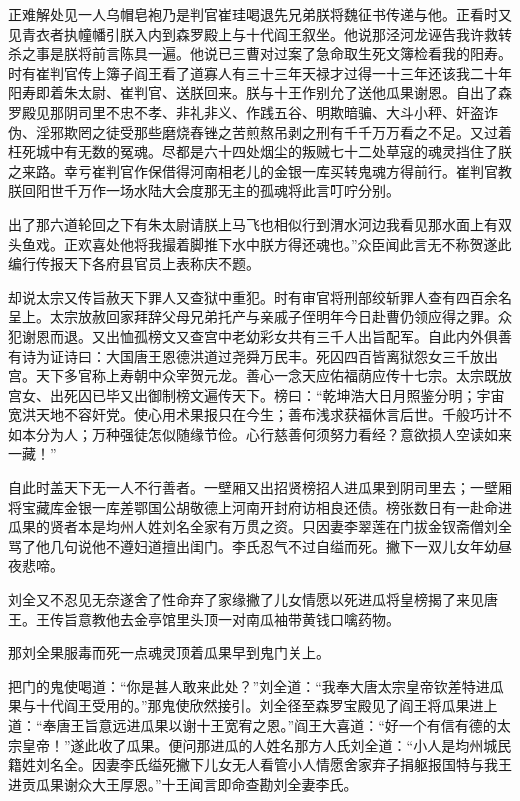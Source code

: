 \documentclass[12pt,UTF8]{ctexbook}
\begin{document}
{正难解处见一人乌帽皂袍乃是判官崔珪喝退先兄弟朕将魏征书传递与他。正看时又见青衣者执幢幡引朕入内到森罗殿上与十代阎王叙坐。他说那泾河龙诬告我许救转杀之事是朕将前言陈具一遍。他说已三曹对过案了急命取生死文簿检看我的阳寿。时有崔判官传上簿子阎王看了道寡人有三十三年天禄才过得一十三年还该我二十年阳寿即着朱太尉、崔判官、送朕回来。朕与十王作别允了送他瓜果谢恩。自出了森罗殿见那阴司里不忠不孝、非礼非义、作践五谷、明欺暗骗、大斗小秤、奸盗诈伪、淫邪欺罔之徒受那些磨烧舂锉之苦煎熬吊剥之刑有千千万万看之不足。又过着枉死城中有无数的冤魂。尽都是六十四处烟尘的叛贼七十二处草寇的魂灵挡住了朕之来路。幸亏崔判官作保借得河南相老儿的金银一库买转鬼魂方得前行。崔判官教朕回阳世千万作一场水陆大会度那无主的孤魂将此言叮咛分别。

出了那六道轮回之下有朱太尉请朕上马飞也相似行到渭水河边我看见那水面上有双头鱼戏。正欢喜处他将我撮着脚推下水中朕方得还魂也。”众臣闻此言无不称贺遂此编行传报天下各府县官员上表称庆不题。

却说太宗又传旨赦天下罪人又查狱中重犯。时有审官将刑部绞斩罪人查有四百余名呈上。太宗放赦回家拜辞父母兄弟托产与亲戚子侄明年今日赴曹仍领应得之罪。众犯谢恩而退。又出恤孤榜文又查宫中老幼彩女共有三千人出旨配军。自此内外俱善有诗为证诗曰：大国唐王恩德洪道过尧舜万民丰。死囚四百皆离狱怨女三千放出宫。天下多官称上寿朝中众宰贺元龙。善心一念天应佑福荫应传十七宗。太宗既放宫女、出死囚已毕又出御制榜文遍传天下。榜曰：“乾坤浩大日月照鉴分明；宇宙宽洪天地不容奸党。使心用术果报只在今生；善布浅求获福休言后世。千般巧计不如本分为人；万种强徒怎似随缘节俭。心行慈善何须努力看经？意欲损人空读如来一藏！”

自此时盖天下无一人不行善者。一壁厢又出招贤榜招人进瓜果到阴司里去；一壁厢将宝藏库金银一库差鄂国公胡敬德上河南开封府访相良还债。榜张数日有一赴命进瓜果的贤者本是均州人姓刘名全家有万贯之资。只因妻李翠莲在门拔金钗斋僧刘全骂了他几句说他不遵妇道擅出闺门。李氏忍气不过自缢而死。撇下一双儿女年幼昼夜悲啼。

刘全又不忍见无奈遂舍了性命弃了家缘撇了儿女情愿以死进瓜将皇榜揭了来见唐王。王传旨意教他去金亭馆里头顶一对南瓜袖带黄钱口噙药物。

那刘全果服毒而死一点魂灵顶着瓜果早到鬼门关上。

把门的鬼使喝道：“你是甚人敢来此处？”刘全道：“我奉大唐太宗皇帝钦差特进瓜果与十代阎王受用的。”那鬼使欣然接引。刘全径至森罗宝殿见了阎王将瓜果进上道：“奉唐王旨意远进瓜果以谢十王宽宥之恩。”阎王大喜道：“好一个有信有德的太宗皇帝！”遂此收了瓜果。便问那进瓜的人姓名那方人氏刘全道：“小人是均州城民籍姓刘名全。因妻李氏缢死撇下儿女无人看管小人情愿舍家弃子捐躯报国特与我王进贡瓜果谢众大王厚恩。”十王闻言即命查勘刘全妻李氏。

}
\end{document}
